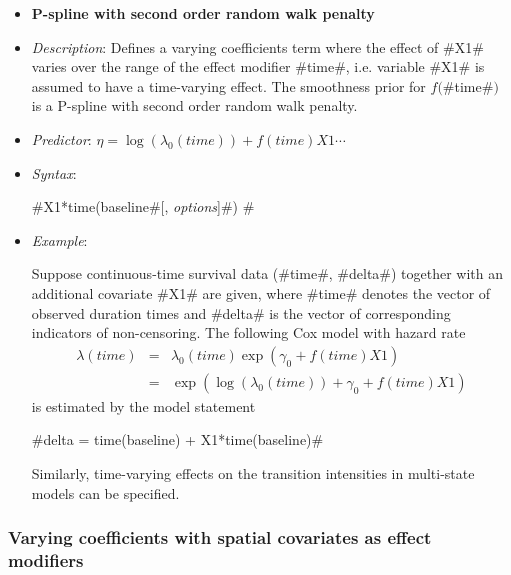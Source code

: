 \begin{itemize}
\item[]{\bf\sffamily P-spline with second order random walk
penalty}

\item[] {\em Description}: Defines a varying coefficients term
where the effect of #X1# varies over the range of the effect
modifier #time#, i.e. variable #X1# is assumed to have a
time-varying effect. The smoothness prior for $f($#time#$)$ is a
P-spline with second order random walk penalty.

 \item[] {\em Predictor}: $\eta = \log(\lambda_0(time)) +
f(time)X1 \cdots$ \item[] {\em Syntax}:

 #X1*time(baseline#[, {\em options}]#) #
 \item[] {\em Example}:

Suppose continuous-time survival data (#time#, #delta#) together
with an additional covariate #X1# are given, where #time# denotes
the vector of observed duration times and #delta# is the vector of
corresponding indicators of non-censoring. The following Cox model
with hazard rate
\begin{eqnarray*}
 \lambda(time) & = & \lambda_0(time)\exp(\gamma_0 + f(time)X1)\\
 & = & \exp\left(\log(\lambda_0(time)) + \gamma_0 + f(time)X1\right)
\end{eqnarray*}
is estimated by the model statement

#delta = time(baseline) + X1*time(baseline)#

Similarly, time-varying effects on the transition intensities in
multi-state models can be specified.
\end{itemize}

\subsubsection*{ Varying coefficients with spatial covariates as
effect modifiers}

